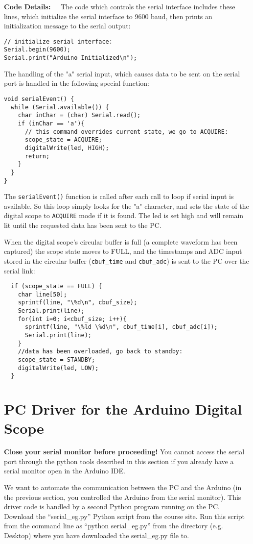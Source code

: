 \documentclass[12pt]{article}
\begin{document}
{\bf Code Details:~~}
The code which controls the serial interface includes these lines, which initialize the serial interface to 9600 baud, then prints an initialization message to the serial output:
\begin{verbatim}
// initialize serial interface:
Serial.begin(9600);
Serial.print("Arduino Initialized\n");
\end{verbatim}
The handling of the "a" serial input, which causes data to be sent on the serial 
port is handled in the following special function:
\begin{verbatim}
void serialEvent() {
  while (Serial.available()) {
    char inChar = (char) Serial.read();
    if (inChar == 'a'){
      // this command overrides current state, we go to ACQUIRE:
      scope_state = ACQUIRE;
      digitalWrite(led, HIGH);
      return;
    }
  }
}
\end{verbatim}
The {\tt serialEvent()} function is called after each call to loop if serial input is available.  So this loop simply looks for the "a" character, and sets the state of the digital scope to {\tt ACQUIRE} mode if it is found.  The led is set high and will remain lit until the requested data has been sent to the PC.

When the digital scope's circular buffer is full (a complete waveform has been captured) the scope state moves to FULL, and the timestamps and ADC input stored in the circular buffer ({\tt cbuf\_time} and {\tt cbuf\_adc}) is sent to the PC over the serial link:
\begin{verbatim}  
  if (scope_state == FULL) {
    char line[50];
    sprintf(line, "\%d\n", cbuf_size);
    Serial.print(line);     
    for(int i=0; i<cbuf_size; i++){
      sprintf(line, "\%ld \%d\n", cbuf_time[i], cbuf_adc[i]);
      Serial.print(line); 
    }
    //data has been overloaded, go back to standby:
    scope_state = STANDBY;
    digitalWrite(led, LOW);
  }
\end{verbatim}

\section{PC Driver for the Arduino Digital Scope}

{\bf Close your serial monitor before proceeding!}  You cannot access the serial port through the python tools described in this section if you already have a serial monitor open in the Arduino IDE.  

We want to automate the communication between the PC and the
Arduino (in the previous section, you controlled the Arduino from the serial monitor).  
This driver code is handled by a second Python program running on the PC.
Download the ``serial\_eg.py'' Python script from the course site.  Run this
script from the command line as ``python serial\_eg.py'' from the directory
(e.g. Desktop) where you have downloaded the serial\_eg.py file to.
\end{document}
